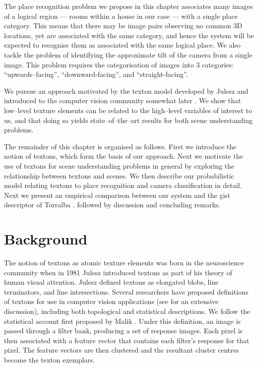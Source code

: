The place recognition problem we propose in this chapter associates
many images of a logical region --- rooms within a house in our case
--- with a single place category. This means that there may be image
pairs observing no common 3D locations, yet are associated with the
same category, and hence the system will be expected to recognise them
as associated with the same logical place. We also tackle the problem
of identifying the approximate tilt of the camera from a single
image. This problem requires the categorisation of images into 3
categories: ``upwards--facing'', ``downward-facing'', and
``straight-facing''.

We pursue an approach motivated by the texton model developed by
Julesz \cite{Julesz81} and introduced to the computer vision community
somewhat later \cite{Zhu02}. We show that low--level texture elements
can be related to the high--level variables of interest to us, and
that doing so yields state--of--the--art results for both scene
understanding problems.

The remainder of this chapter is organised as follows. First we
introduce the notion of textons, which form the basis of our
approach. Next we motivate the use of textons for scene understanding
problems in general by exploring the relationship between textons and
scenes. We then describe our probabilistic model relating textons to
place recognition and camera classification in detail. Next we present
an empirical comparison between our system and the gist descriptor of
Torralba \etal, followed by discussion and concluding remarks.

\section{Background}
\label{sec:background}
The notion of textons as atomic texture elements was born in the
neuroscience community when in 1981 Julesz \cite{Julesz81} introduced
textons as part of his theory of human visual attention. Julesz
defined textons as elongated blobs, line terminators, and line
intersections. Several researchers have proposed definitions of
textons for use in computer vision applications (see \cite{Zhu02} for
an extensive discussion), including both topological and statistical
descriptions. We follow the statistical account first proposed by
Malik \etal \cite{Malik99}. Under this definition, an image is passed
through a filter bank, producing a set of response images. Each pixel
is then associated with a feature vector that contains each filter's
response for that pixel. The feature vectors are then clustered and
the resultant cluster centres become the texton exemplars.

